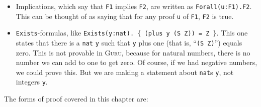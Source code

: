 \documentclass{book}[12pt]
\newcommand{\guru}[0]{\textsc{Guru}\xspace}
\begin{document}
\begin{itemize}

\item Implications, which say that \texttt{F1} implies \texttt{F2},
are written as \texttt{Forall(u:F1).F2}.  This can be thought of as
saying that for any proof \texttt{u} of \texttt{F1}, \texttt{F2} is
true.

\item \texttt{Exists}-formulas, like \texttt{Exists(y:nat). \{ (plus y
(S Z)) = Z \}}.  This one states that there is a \texttt{nat}
\texttt{y} such that \texttt{y} plus one (that is, ``\texttt{(S Z)}'')
equals zero.  This is not provable in \guru, because for natural
numbers, there is no number we can add to one to get zero.  Of course,
if we had negative numbers, we could prove this.  But we are making a
statement about \texttt{nat}s \texttt{y}, not integers \texttt{y}.

\begin{comment}
\item Conjunctions, which assert that \texttt{F1} and \texttt{F2} are
both true, are written as \texttt{Exists(u:F1).F2}. This can be
thought of as saying that there exists a proof \texttt{u} of
\texttt{F1} such that \texttt{F2} is true.
\end{comment}

\end{itemize}


\noindent The forms of proof covered in this chapter are:
\end{document}
